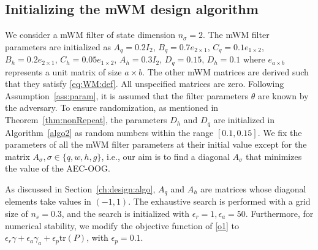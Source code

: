 \subsection{Initializing the mWM design algorithm}
We consider a mWM filter of state dimension $n_{\sigma}=2$. The mWM filter parameters are initialized as $A_q = 0.2I_2$, $B_q=0.7e_{2 \times 1}$, $C_q = 0.1 e_{1 \times 2}$, $B_h=0.2e_{2 \times 1}$, $C_h=0.05 e_{1 \times 2}$, $A_h=0.3I_2$, $D_q=0.15$, $D_h=0.1$ where $e_{a \times b}$ represents a unit matrix of size $a \times b$. 
The other mWM matrices are derived such that they satisfy \eqref{eq:WM:def}. 
All unspecified matrices are zero. Following Assumption~\ref{ass:param}, it is assumed that the filter parameters $\theta$ are known by the adversary. 
To ensure randomization, as mentioned in Theorem~\ref{thm:nonRepeat}, the parameters $D_h$ and $D_q$ are initialized in Algorithm~\ref{algo2} as random numbers within the range $[0.1,0.15]$. We fix the parameters of all the mWM filter parameters at their initial value except for the matrix $A_{\sigma}, \sigma \in \{q,w,h,g\}$, i.e., our aim is to find a diagonal $A_{\sigma}$ that minimizes the value of the AEC-OOG.

As discussed in Section~\ref{ch:design:algo}, $A_q$ and $A_h$ are matrices whose diagonal elements take values in $(-1,1)$.
The exhaustive search is performed with a grid size of $n_s = 0.3$, and the search is initialized with ${\epsilon_r = 1}, {\epsilon_a = 50}$. Furthermore, for numerical stability, we modify the objective function of \eqref{o1} to $\epsilon_r \gamma + \epsilon_a \gamma_a + \epsilon_p \mathrm{tr}(P)$, with ${\epsilon_p = 0.1}$.


